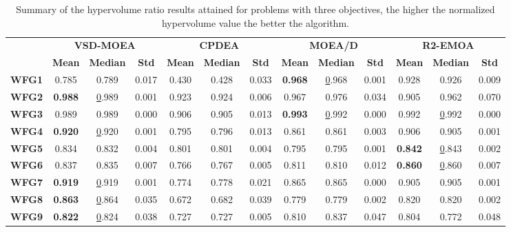 \begin{table*}[t]
\caption{Summary of the hypervolume ratio results attained for problems with three objectives, the higher the normalized hypervolume value the better the algorithm.}
\label{tab:StatisticsHV_3obj}
\tiny
\begin{tabular}{cc|c|c|c|c|c|c|c|c|c|c|c}
\cline{2-13}
\textbf{} & \multicolumn{3}{c|}{\textbf{VSD-MOEA}} & \multicolumn{3}{c|}{\textbf{CPDEA}} & \multicolumn{3}{c|}{\textbf{MOEA/D}} & \multicolumn{3}{c}{\textbf{R2-EMOA}} \\ \cline{2-13} 
\textbf{} & \textbf{Mean} & \textbf{Median} & \textbf{Std} & \textbf{Mean} & \textbf{Median} & \textbf{Std} & \textbf{Mean} & \textbf{Median} & \textbf{Std} & \textbf{Mean} & \textbf{Median} & \textbf{Std} \\ \hline
\multicolumn{1}{c|}{\textbf{WFG1}} & 0.785 & 0.789 & 0.017 & 0.430 & 0.428 & 0.033 & \textbf{0.968} & {\ul 0.968} & 0.001 & 0.928 & 0.926 & 0.009 \\ \hline
\multicolumn{1}{c|}{\textbf{WFG2}} & \textbf{0.988} & {\ul 0.989} & 0.001 & 0.923 & 0.924 & 0.006 & 0.967 & 0.976 & 0.034 & 0.905 & 0.962 & 0.070 \\ \hline
\multicolumn{1}{c|}{\textbf{WFG3}} & 0.989 & 0.989 & 0.000 & 0.906 & 0.905 & 0.013 & \textbf{0.993} & {\ul 0.992} & 0.000 & 0.992 & {\ul 0.992} & 0.000 \\ \hline
\multicolumn{1}{c|}{\textbf{WFG4}} & \textbf{0.920} & {\ul 0.920} & 0.001 & 0.795 & 0.796 & 0.013 & 0.861 & 0.861 & 0.003 & 0.906 & 0.905 & 0.001 \\ \hline
\multicolumn{1}{c|}{\textbf{WFG5}} & 0.834 & 0.832 & 0.004 & 0.801 & 0.801 & 0.004 & 0.795 & 0.795 & 0.001 & \textbf{0.842} & {\ul 0.843} & 0.002 \\ \hline
\multicolumn{1}{c|}{\textbf{WFG6}} & 0.837 & 0.835 & 0.007 & 0.766 & 0.767 & 0.005 & 0.811 & 0.810 & 0.012 & \textbf{0.860} & {\ul 0.860} & 0.007 \\ \hline
\multicolumn{1}{c|}{\textbf{WFG7}} & \textbf{0.919} & {\ul 0.919} & 0.001 & 0.774 & 0.778 & 0.021 & 0.865 & 0.865 & 0.000 & 0.905 & 0.905 & 0.001 \\ \hline
\multicolumn{1}{c|}{\textbf{WFG8}} & \textbf{0.863} & {\ul 0.864} & 0.035 & 0.672 & 0.682 & 0.039 & 0.779 & 0.779 & 0.002 & 0.820 & 0.820 & 0.002 \\ \hline
\multicolumn{1}{c|}{\textbf{WFG9}} & \textbf{0.822} & {\ul 0.824} & 0.038 & 0.727 & 0.727 & 0.005 & 0.810 & 0.837 & 0.047 & 0.804 & 0.772 & 0.048 \\ \hline

\end{tabular}
\end{table*}
